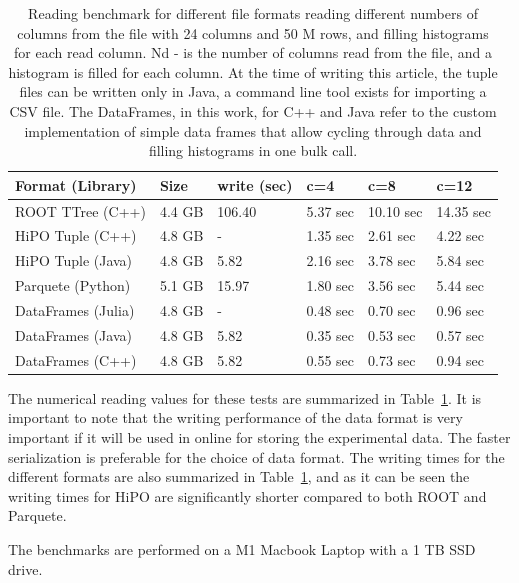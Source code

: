 \begin{table}[h!]
\centering
\begin{tabular}{|p{4cm}|p{1.5cm}|p{2cm}|p{2cm}|p{2cm}|p{2cm}|}
\hline
\textbf{Format (Library)} & Size  & write (sec) & c=4 & \textbf{c=8} & \textbf{c=12}  \\ \hline \hline
ROOT TTree (C++)  &  4.4 GB & 106.40 & 5.37 sec&10.10 sec& 14.35 sec       \\ \hline
HiPO Tuple   (C++)   & 4.8 GB & -  & 1.35 sec & 2.61 sec & 4.22 sec       \\ \hline
HiPO Tuple  (Java)   & 4.8  GB & 5.82 & 2.16 sec & 3.78 sec & 5.84 sec     \\ \hline
Parquete (Python)     &  5.1 GB & 15.97 & 1.80 sec & 3.56 sec & 5.44 sec        \\ \hline
DataFrames (Julia)   &  4.8 GB & - & 0.48 sec & 0.70 sec & 0.96 sec      \\ \hline
DataFrames  (Java)   & 4.8  GB & 5.82 & 0.35 sec & 0.53 sec& 0.57 sec   \\ \hline
DataFrames  (C++)   & 4.8  GB & 5.82 & 0.55 sec & 0.73 sec& 0.94 sec   \\ \hline
\end{tabular}
\caption{Reading benchmark for different file formats reading different numbers of columns from the file with 24 columns and 50 M rows, and filling histograms for each read column. Nd - is the number of columns read from the file, and a histogram is filled for each column. At the time of writing this article, the tuple files can be written only in Java, a command line tool exists for importing a CSV file. The DataFrames, in this work, for C++ and Java refer to the custom implementation of simple data frames that allow cycling through data and filling histograms in one bulk call. }
\label{tab:read_benchmark}
\end{table}

The numerical reading values for these tests are summarized in Table~\ref{tab:read_benchmark}. It is important to note that the writing performance of the data format is very important if it will be used in online for storing the experimental data. The faster serialization is preferable for the choice of data format. The writing times for the different formats are also summarized in Table~\ref{tab:read_benchmark}, and as it can be seen the writing times for HiPO are significantly shorter compared to both ROOT and Parquete.

The benchmarks are performed on a M1 Macbook Laptop with a 1 TB SSD drive.
